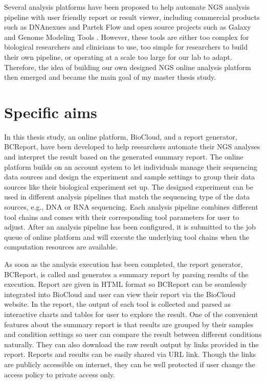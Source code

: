 Several analysis platforms have been proposed to help automate NGS analysis
pipeline with user friendly report or result viewer, including commercial
products such as DNAnexues \cite{:dnanexus} and Partek Flow \cite{:partek} and
open source projects such as Galaxy \cite{goecks2010:galaxy} and Genome
Modeling Tools \cite{griffith2015:genome}. However, these tools are either too
complex for biological researchers and clinicians to use, too simple for
researchers to build their own pipeline, or operating at a scale too large for
our lab to adapt. Therefore, the idea of building our own designed NGS online
analysis platform then emerged and became the main goal of my master thesis
study.


\section{Specific aims}
\label{s:specific-aim}

%
%

In this thesis study, an online platform, BioCloud, and a report generator,
BCReport, have been developed to help researchers automate their NGS analyses
and interpret the result based on the generated summary report. The online
platform builds on an account system to let individuals manage their sequencing
data sources and design the experiment and sample settings to group their data
sources like their biological experiment set up. The designed experiment can be
used in different analysis pipelines that match the sequencing type of the data
sources, e.g., DNA or RNA sequencing. Each analysis pipeline combines different
tool chains and comes with their corresponding tool parameters for user to
adjust. After an analysis pipeline has been configured, it is submitted to the
job queue of online platform and will execute the underlying tool chains when
the computation resources are available.

As soon as the analysis execution has been completed, the report generator,
BCReport, is called and generates a summary report by parsing results of the
execution. Report are given in HTML format so BCReport can be seamlessly
integrated into BioCloud and user can view their report via the BioCloud
website. In the report, the output of each tool is collected and parsed as
interactive charts and tables for user to explore the result. One of the
convenient features about the summary report is that results are grouped by
their samples and condition settings so user can compare the result between
different conditions naturally. They can also download the raw result output by
links provided in the report. Reports and results can be easily shared via URL
link. Though the links are publicly accessible on internet, they can be well
protected if user change the access policy to private access only.



